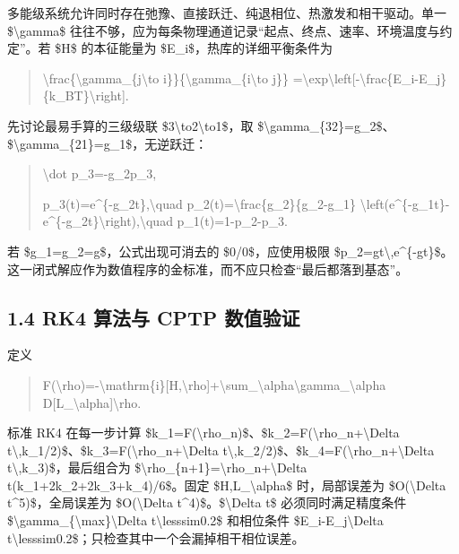 \documentclass[UTF8,openany,11pt,fontset=fandol]{ctexbook}
\begin{document}
多能级系统允许同时存在弛豫、直接跃迁、纯退相位、热激发和相干驱动。单一
\$\textbackslash gamma\$
往往不够，应为每条物理通道记录``起点、终点、速率、环境温度与约定''。若
\$H\$ 的本征能量为 \$E\_i\$，热库的详细平衡条件为

\begin{quote}
\textbackslash frac\{\textbackslash gamma\_\{j\textbackslash to
i\}\}\{\textbackslash gamma\_\{i\textbackslash to j\}\}
=\textbackslash exp\textbackslash left{[}-\textbackslash frac\{E\_i-E\_j\}\{k\_BT\}\textbackslash right{]}.
\end{quote}

先讨论最易手算的三级级联 \$3\textbackslash to2\textbackslash to1\$，取
\$\textbackslash gamma\_\{32\}=g\_2\$、\$\textbackslash gamma\_\{21\}=g\_1\$，无逆跃迁：

\begin{quote}
\textbackslash dot p\_3=-g\_2p\_3,

p\_3(t)=e\^{}\{-g\_2t\},\textbackslash quad
p\_2(t)=\textbackslash frac\{g\_2\}\{g\_2-g\_1\}
\textbackslash left(e\^{}\{-g\_1t\}-e\^{}\{-g\_2t\}\textbackslash right),\textbackslash quad
p\_1(t)=1-p\_2-p\_3.
\end{quote}

若 \$g\_1=g\_2=g\$，公式出现可消去的 \$0/0\$，应使用极限
\$p\_2=gt\textbackslash,e\^{}\{-gt\}\$。这一闭式解应作为数值程序的金标准，而不应只检查``最后都落到基态''。

\subsection{\texorpdfstring{\textbf{1.4 RK4 算法与 CPTP
数值验证}}{1.4 RK4 算法与 CPTP 数值验证}}\label{rk4-ux7b97ux6cd5ux4e0e-cptp-ux6570ux503cux9a8cux8bc1}

定义

\begin{quote}
F(\textbackslash rho)=-\textbackslash mathrm\{i\}{[}H,\textbackslash rho{]}+\textbackslash sum\_\textbackslash alpha\textbackslash gamma\_\textbackslash alpha
D{[}L\_\textbackslash alpha{]}\textbackslash rho.
\end{quote}

标准 RK4 在每一步计算
\$k\_1=F(\textbackslash rho\_n)\$、\$k\_2=F(\textbackslash rho\_n+\textbackslash Delta
t\textbackslash,k\_1/2)\$、\$k\_3=F(\textbackslash rho\_n+\textbackslash Delta
t\textbackslash,k\_2/2)\$、\$k\_4=F(\textbackslash rho\_n+\textbackslash Delta
t\textbackslash,k\_3)\$，最后组合为
\$\textbackslash rho\_\{n+1\}=\textbackslash rho\_n+\textbackslash Delta
t(k\_1+2k\_2+2k\_3+k\_4)/6\$。固定 \$H,L\_\textbackslash alpha\$
时，局部误差为 \$O(\textbackslash Delta t\^{}5)\$，全局误差为
\$O(\textbackslash Delta t\^{}4)\$。\$\textbackslash Delta t\$
必须同时满足精度条件
\$\textbackslash gamma\_\{\textbackslash max\}\textbackslash Delta
t\textbackslash lesssim0.2\$ 和相位条件
\$\textbar E\_i-E\_j\textbar\textbackslash Delta
t\textbackslash lesssim0.2\$；只检查其中一个会漏掉相干相位误差。
\end{document}
